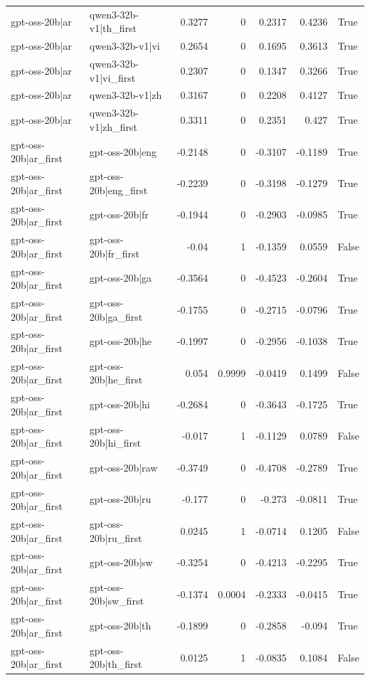 \begin{table}
\begin{tabular}{l l r r r r l}
gpt-oss-20b|ar & qwen3-32b-v1|th_first & 0.3277 & 0 & 0.2317 & 0.4236 & True \\
gpt-oss-20b|ar & qwen3-32b-v1|vi & 0.2654 & 0 & 0.1695 & 0.3613 & True \\
gpt-oss-20b|ar & qwen3-32b-v1|vi_first & 0.2307 & 0 & 0.1347 & 0.3266 & True \\
gpt-oss-20b|ar & qwen3-32b-v1|zh & 0.3167 & 0 & 0.2208 & 0.4127 & True \\
gpt-oss-20b|ar & qwen3-32b-v1|zh_first & 0.3311 & 0 & 0.2351 & 0.427 & True \\
gpt-oss-20b|ar_first & gpt-oss-20b|eng & -0.2148 & 0 & -0.3107 & -0.1189 & True \\
gpt-oss-20b|ar_first & gpt-oss-20b|eng_first & -0.2239 & 0 & -0.3198 & -0.1279 & True \\
gpt-oss-20b|ar_first & gpt-oss-20b|fr & -0.1944 & 0 & -0.2903 & -0.0985 & True \\
gpt-oss-20b|ar_first & gpt-oss-20b|fr_first & -0.04 & 1 & -0.1359 & 0.0559 & False \\
gpt-oss-20b|ar_first & gpt-oss-20b|ga & -0.3564 & 0 & -0.4523 & -0.2604 & True \\
gpt-oss-20b|ar_first & gpt-oss-20b|ga_first & -0.1755 & 0 & -0.2715 & -0.0796 & True \\
gpt-oss-20b|ar_first & gpt-oss-20b|he & -0.1997 & 0 & -0.2956 & -0.1038 & True \\
gpt-oss-20b|ar_first & gpt-oss-20b|he_first & 0.054 & 0.9999 & -0.0419 & 0.1499 & False \\
gpt-oss-20b|ar_first & gpt-oss-20b|hi & -0.2684 & 0 & -0.3643 & -0.1725 & True \\
gpt-oss-20b|ar_first & gpt-oss-20b|hi_first & -0.017 & 1 & -0.1129 & 0.0789 & False \\
gpt-oss-20b|ar_first & gpt-oss-20b|raw & -0.3749 & 0 & -0.4708 & -0.2789 & True \\
gpt-oss-20b|ar_first & gpt-oss-20b|ru & -0.177 & 0 & -0.273 & -0.0811 & True \\
gpt-oss-20b|ar_first & gpt-oss-20b|ru_first & 0.0245 & 1 & -0.0714 & 0.1205 & False \\
gpt-oss-20b|ar_first & gpt-oss-20b|sw & -0.3254 & 0 & -0.4213 & -0.2295 & True \\
gpt-oss-20b|ar_first & gpt-oss-20b|sw_first & -0.1374 & 0.0004 & -0.2333 & -0.0415 & True \\
gpt-oss-20b|ar_first & gpt-oss-20b|th & -0.1899 & 0 & -0.2858 & -0.094 & True \\
gpt-oss-20b|ar_first & gpt-oss-20b|th_first & 0.0125 & 1 & -0.0835 & 0.1084 & False \\

\end{tabular}
\end{table}
